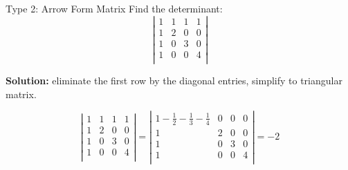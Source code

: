 \documentclass{beamer}
\begin{document}
\begin{frame}{Type 2: Arrow Form Matrix}
Find the determinant:
\begin{equation*}
    \left| \begin{matrix}
        1&		1&		1&		1		\\
        1&		2&		0&		0		\\
        1&		0&		3&		0		\\
        1&		0&		0&		4		\\
    \end{matrix} \right|
\end{equation*}

\textbf{Solution:} eliminate the first row by the diagonal entries, simplify to triangular matrix.

\begin{equation*}
    \left| \begin{matrix}
        1&		1&		1&		1\\
        1&		2&		0&		0\\
        1&		0&		3&		0\\
        1&		0&		0&		4\\
    \end{matrix} \right|=\left| \begin{matrix}
        1-\frac{1}{2}-\frac{1}{3}-\frac{1}{4}&		0&		0&		0\\
        1&		2&		0&		0\\
        1&		0&		3&		0\\
        1&		0&		0&		4\\
    \end{matrix} \right|=-2
\end{equation*}
\end{frame}
\end{document}
